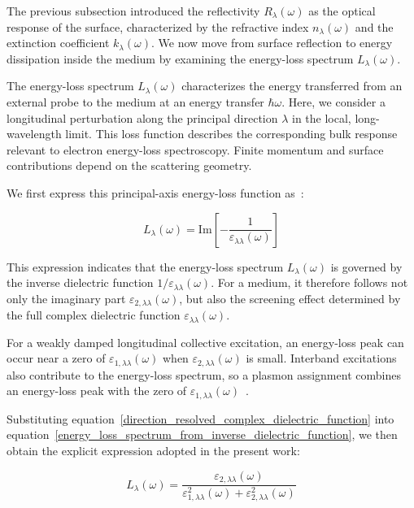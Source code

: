The previous subsection introduced the reflectivity $R_{\lambda}(\omega)$ as the optical response of the surface,
characterized by the refractive index $n_{\lambda}(\omega)$ and the extinction coefficient $k_{\lambda}(\omega)$.
We now move from surface reflection to energy dissipation inside the medium by examining the energy-loss spectrum $L_{\lambda}(\omega)$.

The energy-loss spectrum $L_{\lambda}(\omega)$ characterizes the energy transferred from an external probe to the medium at an energy transfer $\hbar\omega$.
Here, we consider a longitudinal perturbation along the principal direction $\lambda$ in the local, long-wavelength limit.
This loss function describes the corresponding bulk response relevant to electron energy-loss spectroscopy.
Finite momentum and surface contributions depend on the scattering geometry.

We first express this principal-axis energy-loss function as~\cite{dressel2002electrodynamics,wooten2013optical,fox2010optical,onida2002electronic}:

\begin{equation}
    L_{\lambda}(\omega)=
    \mathrm{Im}\left[-\frac{1}{\varepsilon_{\lambda\lambda}(\omega)}\right]
\label{energy_loss_spectrum_from_inverse_dielectric_function}
\end{equation}

This expression indicates that the energy-loss spectrum $L_{\lambda}(\omega)$ is governed by the inverse dielectric function $1/\varepsilon_{\lambda\lambda}(\omega)$.
For a medium, it therefore follows not only the imaginary part $\varepsilon_{2,\lambda\lambda}(\omega)$,
but also the screening effect determined by the full complex dielectric function $\varepsilon_{\lambda\lambda}(\omega)$.

For a weakly damped longitudinal collective excitation,
an energy-loss peak can occur near a zero of $\varepsilon_{1,\lambda\lambda}(\omega)$ when $\varepsilon_{2,\lambda\lambda}(\omega)$ is small.
Interband excitations also contribute to the energy-loss spectrum,
so a plasmon assignment combines an energy-loss peak with the zero of $\varepsilon_{1,\lambda\lambda}(\omega)$~\cite{dressel2002electrodynamics,onida2002electronic}.

Substituting equation~\eqref{direction_resolved_complex_dielectric_function} into equation~\eqref{energy_loss_spectrum_from_inverse_dielectric_function}, we then obtain the explicit expression adopted in the present work:

\begin{equation}
    L_{\lambda}(\omega) =
    \frac{\varepsilon_{2,\lambda\lambda}(\omega)}
    {\varepsilon_{1,\lambda\lambda}^{2}(\omega)
    + \varepsilon_{2,\lambda\lambda}^{2}(\omega)}
\label{energy_loss_spectrum_from_dielectric_function}
\end{equation}

